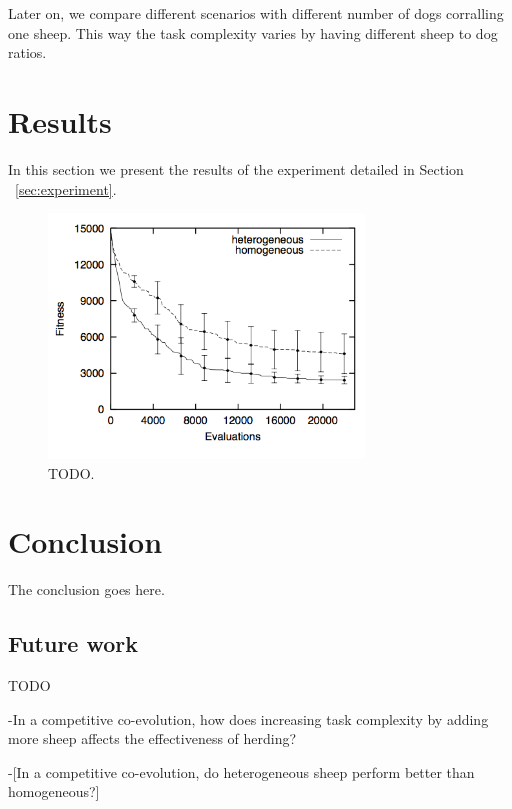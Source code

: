 \documentclass[conference]{IEEEtran}
\begin{document}
 Later on, we compare different scenarios with different number of dogs corralling one sheep. This way the task complexity varies by having different sheep to dog ratios. 


\section{Results}
In this section we present the results of the experiment detailed in Section ~\ref{sec:experiment}.

\begin{figure}[ht]
\centering
\includegraphics[width=3.3in]{imgs/homo_vs_hetero.png}
\caption{TODO.}
\label{fig:homo_vs_hetero}
\end{figure}

\section{Conclusion}
The conclusion goes here.

\subsection{Future work}
TODO

-In a competitive co-evolution, how does increasing task complexity by adding more sheep affects the effectiveness of herding? %

-[In a competitive co-evolution, do heterogeneous sheep perform better than homogeneous?] %





\end{document}
